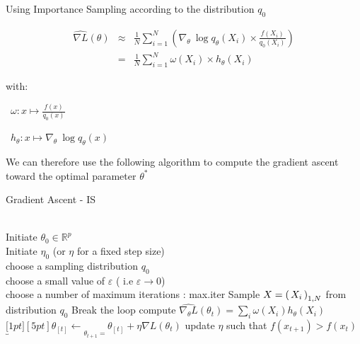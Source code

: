
Using Importance Sampling according to the distribution $q_0$

$$
\begin{array}{rcl}
\widehat{\nabla L}(\theta) 
&\approx& 
\frac 1 N \displaystyle\sum\limits_{i = 1}^N \left( \nabla_\theta \ \log q_\theta (X_i) \times \frac{f(X_i)}{q_0(X_i)}\right)
\\
&=& \frac 1 N \displaystyle\sum_{i = 1}^N \omega(X_i) \times h_\theta(X_i)
\end{array}
$$

with:

\faAngleRight \ $\omega : x \mapsto \frac{f(x)}{q_0(x)}$

\faAngleRight \ $h_\theta : x \mapsto \nabla_\theta \ \log q_\theta(x)$

We can therefore use the following algorithm to compute the gradient ascent toward the optimal parameter $\theta^*$

\begin{algorithm}[H]
\caption{Gradient Ascent - IS}\label{alg:gaIS}
\begin{algorithmic}
    \Require 
    \\ \ra Initiate $\theta_0 \in \mathbb R^p$ 
    \\ \ra Initiate $\eta_0$ (or $\eta$ for a fixed step size) 
    \\ \ra choose a sampling distribution $q_0$
    \\ \ra choose a small value of $\varepsilon$ ( i.e $\varepsilon \rightarrow 0 $)
    \\ \ra choose a number of maximum iterations : max.iter
    \State Sample $X = \left( \, {X} _ {i} \, \right)_{1, N}$ from distribution $q_0$ 
            \State Break the loop
        \EndIf
        \State \ra compute $\widehat{\nabla_\theta L}(\theta_t) = \displaystyle\sum\limits_i\omega(X_i) h_\theta(X_i)$
        \State \ra $\underbracket[1pt][5pt]{\theta_{[t]} \gets}_{\theta_{t+1} = } \theta_{[t]} + \eta \nabla L(\theta_t)$
        \State \ra update $\eta$ such that $f(x_{t+1}) > f(x_t)$ 
    \EndFor  
\end{algorithmic}
\end{algorithm}

